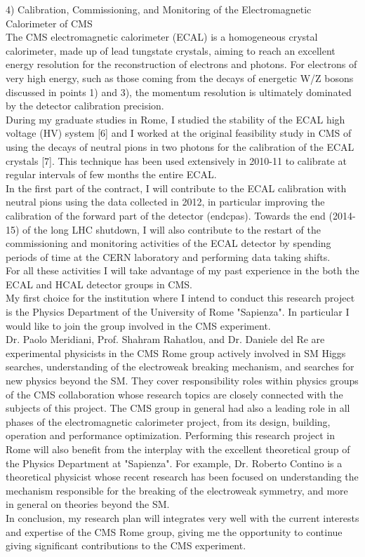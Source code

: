 \documentclass[10pt, a4paper]{article}
\begin{document}
4) Calibration, Commissioning, and Monitoring of the Electromagnetic Calorimeter of CMS\\
The CMS electromagnetic calorimeter (ECAL) is a homogeneous crystal calorimeter, 
made up of lead tungstate crystals, aiming to reach an excellent energy resolution for 
the reconstruction of electrons and photons. For electrons of very high energy, such as 
those coming from the decays of energetic W/Z bosons discussed in points 1) and 3), 
the momentum resolution is ultimately dominated by the detector calibration precision. 
\\
During my graduate studies in Rome, I studied the stability of the ECAL high 
voltage (HV) system [6] and I worked at the original feasibility study in CMS of using 
the decays of neutral pions in two photons for the calibration of the ECAL crystals [7].  
This technique has been 
used extensively in 2010-11 to calibrate at regular intervals of few months 
the entire ECAL.
\\ 
In the first part of the contract, I will contribute to the ECAL calibration with neutral pions 
using the data collected in 2012, in particular improving the calibration of the forward part 
of the detector (endcpas). 
Towards the end (2014-15) of the long LHC shutdown, I will also contribute to the 
restart of the commissioning and monitoring activities of the ECAL detector by 
spending periods of time at the CERN laboratory and performing data taking shifts. \\
For all these activities I will take advantage of my past experience 
in the both the ECAL and HCAL detector groups in CMS.\\

My first choice for the institution where I intend to conduct 
this research project is the Physics Department of the University of Rome "Sapienza".
In particular I would like to join the group involved in the CMS experiment. \\
Dr. Paolo Meridiani, Prof. Shahram Rahatlou, and
Dr. Daniele del Re are experimental physicists in the CMS Rome group actively involved in 
SM Higgs searches, understanding of the electroweak breaking mechanism, and 
searches for new physics beyond the SM. They cover responsibility roles 
within physics groups of the CMS collaboration whose research topics are closely 
connected with the subjects of this project. The CMS group in general had also 
a leading role in all phases of the electromagnetic calorimeter project, from its design, 
building, operation and performance optimization.
Performing this research project in Rome will also benefit from the interplay
with the excellent theoretical group of the Physics Department at "Sapienza".
For example, Dr. Roberto Contino is a theoretical physicist whose recent 
research has been focused on understanding the mechanism responsible 
for the breaking of the electroweak symmetry, and more in general on theories beyond the 
SM. \\
In conclusion, my research plan will integrates very well with the current interests 
and expertise of the CMS Rome group, giving me the opportunity to continue 
giving significant contributions to the CMS experiment. \\
\end{document}
